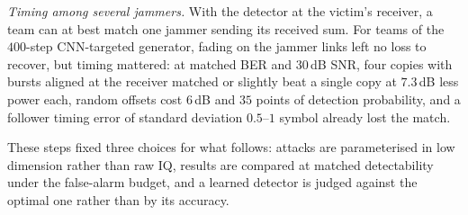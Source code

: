 \textit{Timing among several jammers.}
With the detector at the victim's receiver, a team can at best match one jammer sending its received sum.
For teams of the $400$-step CNN-targeted generator, fading on the jammer links left no loss to recover, but timing mattered: at matched BER and $30$\,dB SNR, four copies with bursts aligned at the receiver matched or slightly beat a single copy at $7.3$\,dB less power each, random offsets cost $6$\,dB and $35$ points of detection probability, and a follower timing error of standard deviation $0.5$--$1$ symbol already lost the match.

These steps fixed three choices for what follows: attacks are parameterised in low dimension rather
than raw IQ, results are compared at matched detectability under the false-alarm budget, and a learned
detector is judged against the optimal one rather than by its accuracy.
